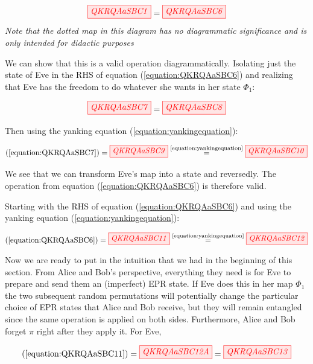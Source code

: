 \documentclass[]{article}
\newcommand{\equaltext}[1]{\ensuremath{\stackrel{\text{#1}}{=}}}
\begin{document}
\begin{equation}
\label{equation:QKRQAaSBC6}
\tikzfig{QKRQAaSBC1} = \tikzfig{QKRQAaSBC6}
\end{equation}
\textit{Note that the dotted map in this diagram has no diagrammatic significance and is only intended for didactic purposes}

We can show that this is a valid operation diagrammatically. Isolating just the state of Eve in the RHS of equation (\ref{equation:QKRQAaSBC6}) and realizing that Eve has the freedom to do whatever she wants in her state $\Phi_1$:

\begin{equation}
\label{equation:QKRQAaSBC7}
\tikzfig{QKRQAaSBC7} = \tikzfig{QKRQAaSBC8}
\end{equation}

Then using the yanking equation (\ref{equation:yankingequation}):

\begin{equation}
\label{equation:QKRQAaSBC9}
(\ref{equation:QKRQAaSBC7}) = \tikzfig{QKRQAaSBC9} \equaltext{\ref{equation:yankingequation}} \tikzfig{QKRQAaSBC10}
\end{equation}

We see that we can transform Eve's map into a state and reversedly. The operation from equation (\ref{equation:QKRQAaSBC6}) is therefore valid.

Starting with the RHS of equation (\ref{equation:QKRQAaSBC6}) and using the yanking equation (\ref{equation:yankingequation}):

\begin{equation}
\begin{aligned}
\label{equation:QKRQAaSBC11}
 (\ref{equation:QKRQAaSBC6}) = \tikzfig{QKRQAaSBC11} \equaltext{\ref{equation:yankingequation}} \tikzfig{QKRQAaSBC12}
\end{aligned}
\end{equation}

Now we are ready to put in the intuition that we had in the beginning of this section. From Alice and Bob's perspective, everything they need is for Eve to prepare and send them an (imperfect) EPR state. If Eve does this in her map $\Phi_1$ the two subsequent random permutations will potentially change the particular choice of EPR states that Alice and Bob receive, but they will remain entangled since the same operation is applied on both sides. Furthermore, Alice and Bob forget $\pi$ right after they apply it. For Eve, 

\begin{equation}
	\label{equation:QKRQAaSBC13}
	(\ref{equation:QKRQAaSBC11}) = \tikzfig{QKRQAaSBC12A} = \tikzfig{QKRQAaSBC13}
\end{equation}
\end{document}
